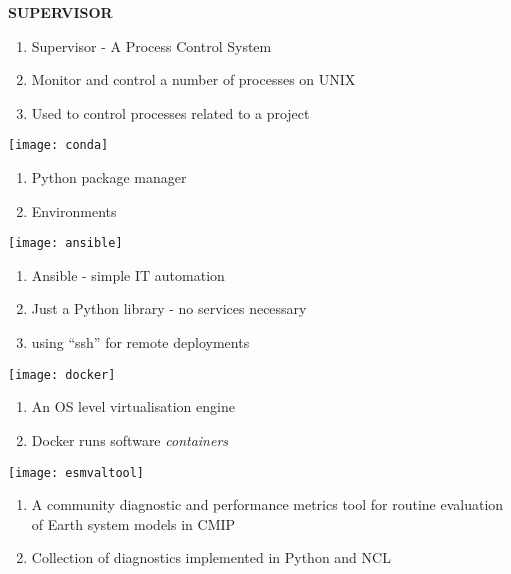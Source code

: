 \documentclass[portrait,a0paper,fontscale=0.4]{baposter} %
\newcommand{\compresslist}{%
\setlength{\itemsep}{1pt}%
\setlength{\parskip}{0pt}%
\setlength{\parsep}{0pt}%
}
\begin{document}
\begin{poster}
{\begin{multicols}{2}
    {\bf SUPERVISOR}
    \begin{enumerate}\compresslist
      \item Supervisor - A Process Control System
      \item Monitor and control a number of processes on UNIX
      \item Used to control processes related to a project
    \end{enumerate}

    \texttt{[image: conda]}
    \begin{enumerate}\compresslist
      \item Python package manager
      \item Environments
    \end{enumerate}

    \texttt{[image: ansible]}
    \begin{enumerate}\compresslist
      \item Ansible - simple IT automation
      \item Just a Python library - no services necessary
      \item using ``ssh'' for remote deployments
    \end{enumerate}

    \texttt{[image: docker]}
    \begin{enumerate}\compresslist
      \item An OS level virtualisation engine
      \item Docker runs software \textit{containers}
    \end{enumerate}

    \texttt{[image: esmvaltool]}
    \begin{enumerate}\compresslist
      \item A community diagnostic and performance metrics tool for routine evaluation of Earth system models in CMIP
      \item Collection of diagnostics implemented in Python and NCL
    \end{enumerate}
  \end{multicols}
}

\end{poster}
\end{document}
